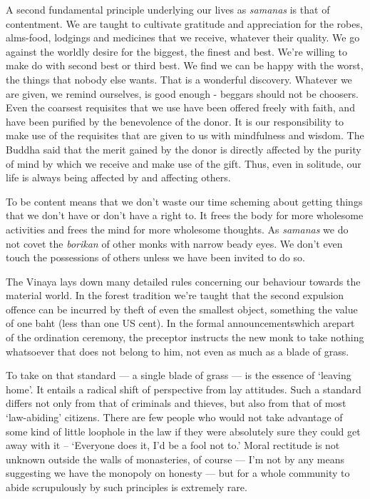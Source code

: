 A second fundamental principle underlying our lives as \emph{samanas} is
that of contentment. We are taught to cultivate gratitude and
appreciation for the robes, alms-food, lodgings and medicines that we
receive, whatever their quality. We go against the worldly desire for
the biggest, the finest and best. We're willing to make do with second
best or third best. We find we can be happy with the worst, the things
that nobody else wants. That is a wonderful discovery. Whatever we are
given, we remind ourselves, is good enough - beggars should not be
choosers. Even the coarsest requisites that we use have been offered
freely with faith, and have been purified by the benevolence of the
donor. It is our responsibility to make use of the requisites that are
given to us with mindfulness and wisdom. The Buddha said that the merit
gained by the donor is directly affected by the purity of mind by which
we receive and make use of the gift. Thus, even in solitude, our life is
always being affected by and affecting others.

To be content means that we don't waste our time scheming about getting
things that we don't have or don't have a right to. It frees the body
for more wholesome activities and frees the mind for more wholesome
thoughts. As \emph{samanas} we do not covet the \emph{borikan} of other
monks with narrow beady eyes. We don't even touch the possessions of
others unless we have been invited to do so.

The Vinaya lays down many detailed rules concerning our behaviour
towards the material world. In the forest tradition we're taught that
the second expulsion offence can be incurred by theft of even the
smallest object, something the value of one baht (less than one US
cent). In the formal announcementswhich arepart of the ordination
ceremony, the preceptor instructs the new monk to take nothing
whatsoever that does not belong to him, not even as much as a blade of
grass.

To take on that standard --- a single blade of grass --- is the essence
of `leaving home'. It entails a radical shift of perspective from lay
attitudes. Such a standard differs not only from that of criminals and
thieves, but also from that of most `law-abiding' citizens. There are
few people who would not take advantage of some kind of little loophole
in the law if they were absolutely sure they could get away with it --
`Everyone does it, I'd be a fool not to.' Moral rectitude is not unknown
outside the walls of monasteries, of course --- I'm not by any means
suggesting we have the monopoly on honesty --- but for a whole community
to abide scrupulously by such principles is extremely rare.


